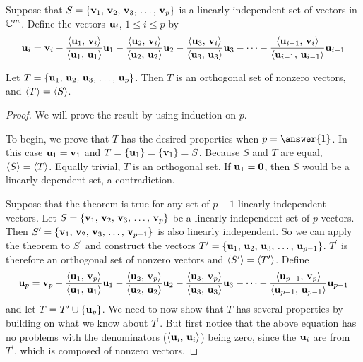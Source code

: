 \documentclass{ximera}
\begin{document}
\begin{theorem}
  \label{theorem:GSP}

  Suppose that $S=\left\{\mathbf{v}_{1},\,\mathbf{v}_{2},\,\mathbf{v}_{3},\,\ldots,\,\mathbf{v}_{p}\right\}$ is a linearly independent set of vectors in $\mathbb{C}^{m}$.  Define the vectors $\mathbf{u}_i$, $1\leq i\leq p$ by
  \[
    \mathbf{u}_i=\mathbf{v}_i
    -\frac{\left\langle\mathbf{u}_1,\,\mathbf{v}_i\right\rangle}{\left\langle\mathbf{u}_1,\,\mathbf{u}_1\right\rangle}\mathbf{u}_1
    -\frac{\left\langle\mathbf{u}_2,\,\mathbf{v}_i\right\rangle}{\left\langle\mathbf{u}_2,\,\mathbf{u}_2\right\rangle}\mathbf{u}_2
    -\frac{\left\langle\mathbf{u}_3,\,\mathbf{v}_i\right\rangle}{\left\langle\mathbf{u}_3,\,\mathbf{u}_3\right\rangle}\mathbf{u}_3
    -\cdots
    -\frac{\left\langle\mathbf{u}_{i-1},\,\mathbf{v}_i\right\rangle}{\left\langle\mathbf{u}_{i-1},\,\mathbf{u}_{i-1}\right\rangle}\mathbf{u}_{i-1}
  \]
  
  
  Let $T=\left\{\mathbf{u}_{1},\,\mathbf{u}_{2},\,\mathbf{u}_{3},\,\ldots,\,\mathbf{u}_{p}\right\}$.  Then $T$ is an orthogonal set of nonzero vectors, and $\left\langle T\right\rangle=\left\langle S\right\rangle$.
  
  \begin{proof}
    We will prove the result by using induction on $p$.
    
    To begin, we prove that $T$ has the desired properties when
    $p=\answer{1}$.  In this case $\mathbf{u}_1=\mathbf{v}_1$ and
    $T=\left\{\mathbf{u}_1\right\}=\left\{\mathbf{v}_1\right\}=S$.  Because $S$ and $T$ are
    equal, $\left\langle S\right\rangle=\left\langle T\right\rangle$.  Equally trivial, $T$ is an orthogonal
    set.  If $\mathbf{u}_1=\mathbf{0}$, then $S$ would be a linearly
    dependent set, a contradiction.

    Suppose that the theorem is true for any set of $p-1$ linearly
    independent vectors.  Let $S=\left\{\mathbf{v}_{1},\,\mathbf{v}_{2},\,\mathbf{v}_{3},\,\ldots,\,\mathbf{v}_{p}\right\}$ be a
    linearly independent set of $p$ vectors.  Then
    $S^\prime=\left\{\mathbf{v}_{1},\,\mathbf{v}_{2},\,\mathbf{v}_{3},\,\ldots,\,\mathbf{v}_{p-1}\right\}$ is also linearly independent.
    So we can apply the theorem to $S^\prime$ and construct the
    vectors $T^\prime=\left\{\mathbf{u}_{1},\,\mathbf{u}_{2},\,\mathbf{u}_{3},\,\ldots,\,\mathbf{u}_{p-1}\right\}$.  $T^\prime$ is
    therefore an orthogonal set of nonzero vectors and
    $\left\langle S^\prime\right\rangle=\left\langle T^\prime\right\rangle$.  Define
    \[
      \mathbf{u}_p=\mathbf{v}_p
      -\frac{\left\langle\mathbf{u}_1,\,\mathbf{v}_p\right\rangle}{\left\langle\mathbf{u}_1,\,\mathbf{u}_1\right\rangle}\mathbf{u}_1
      -\frac{\left\langle\mathbf{u}_2,\,\mathbf{v}_p\right\rangle}{\left\langle\mathbf{u}_2,\,\mathbf{u}_2\right\rangle}\mathbf{u}_2
      -\frac{\left\langle\mathbf{u}_3,\,\mathbf{v}_p\right\rangle}{\left\langle\mathbf{u}_3,\,\mathbf{u}_3\right\rangle}\mathbf{u}_3
      -\cdots
      -\frac{\left\langle\mathbf{u}_{p-1},\,\mathbf{v}_p\right\rangle}{\left\langle\mathbf{u}_{p-1},\,\mathbf{u}_{p-1}\right\rangle}\mathbf{u}_{p-1}
    \]
    and let $T=T^\prime\cup\left\{\mathbf{u}_p\right\}$.  We need to now show
    that $T$ has several properties by building on what we know about
    $T^\prime$.  But first notice that the above equation has no
    problems with the denominators
    ($\left\langle\mathbf{u}_i,\,\mathbf{u}_i\right\rangle$) being zero, since the
    $\mathbf{u}_i$ are from $T^\prime$, which is composed of nonzero
    vectors.


\end{proof}
\end{theorem}
\end{document}
